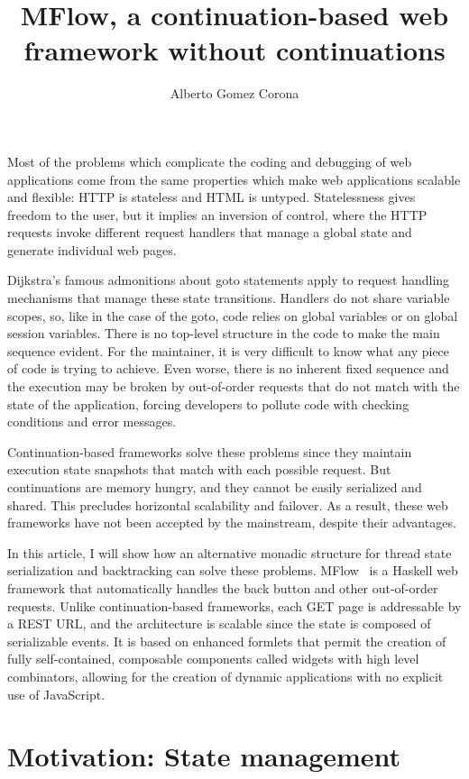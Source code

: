 \documentclass{tmr}
\title{MFlow, a continuation-based web framework without continuations}
\author{Alberto Gomez Corona\email{agocorona@gmail.com}}
\begin{document}
 
\begin{introduction} 
Most of the problems which complicate the coding and debugging of web applications come from the same properties which make web applications scalable and flexible: HTTP is stateless and HTML is untyped. Statelessness gives freedom to the user, but it implies an inversion of control, where the HTTP requests invoke different request handlers that manage a global state and generate individual web pages.

Dijkstra's famous admonitions about goto statements apply to request handling mechanisms that manage these state transitions. Handlers do not share variable scopes, so, like in the case of the goto, code relies on global variables or on global session variables. There is no top-level structure in the code to make the main sequence evident. For the maintainer, it is very difficult to know what any piece of code is trying to achieve. Even worse, there is no inherent fixed sequence and the execution may be broken by out-of-order requests that do not match with the state of the application,  forcing developers to pollute code with checking conditions and error messages. 
 
Continuation-based frameworks solve these problems since they maintain execution state snapshots that match with each possible request. But continuations are memory hungry, and they cannot be easily serialized and shared. This precludes horizontal scalability and failover. As a result, these web frameworks have not been accepted by the mainstream, despite their advantages. 
 
In this article, I will show how an alternative monadic structure for thread state serialization and backtracking can solve these problems. MFlow~\cite{auth:mflow} is a Haskell web framework that automatically handles the back button and other out-of-order requests. Unlike continuation-based frameworks, each GET page is addressable by a REST URL, and the  architecture is scalable since the state is composed of serializable events. It is based on enhanced formlets that permit the creation of fully self-contained, composable components called widgets with high level combinators, allowing for the creation of dynamic applications with no explicit use of JavaScript. 
 
\end{introduction} 
 
 
\section{ Motivation: State management} 
 
\end{document}

